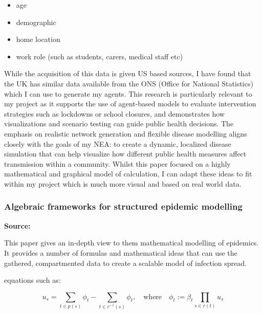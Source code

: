 \begin{itemize}
    \item age
    \item demographic
    \item home location
    \item work role (such as students, carers, medical staff etc)
\end{itemize}

While the acquisition of this data is given US based sources, I have found that the UK has similar data available from the ONS (Office for National Statistics) which I can use to generate my agents.
This research is particularly relevant to my project as it supports the use of agent-based models to evaluate intervention strategies such as lockdowns or school closures, and demonstrates how visualizations and scenario testing can guide public health decisions. The emphasis on realistic network generation and flexible disease modelling aligns closely with the goals of my NEA: to create a dynamic, localized disease simulation that can help visualize how different public health measures affect transmission within a community. Whilst this paper focused on a highly mathematical and graphical model of calculation, I can adapt these ideas to fit within my project which is much more visual and based on real world data.

\subsubsection*{Algebraic frameworks for structured epidemic modelling}
\textbf{Source:} \autocite{libkindAlgebraicFrameworkStructured2022}

This paper gives an in-depth view to them mathematical modelling of epidemics. It provides a number of formulas and mathematical ideas that can use the gathered, compartmented data to create a scalable model of infection spread.

equations such as:


\[
    u_s = \sum_{t \in p(s)} \phi_t - \sum_{t \in r^{-1}(s)} \phi_t, \quad \text{where} \quad \phi_t := \beta_t \prod_{s \in r(t)} u_s
\]

